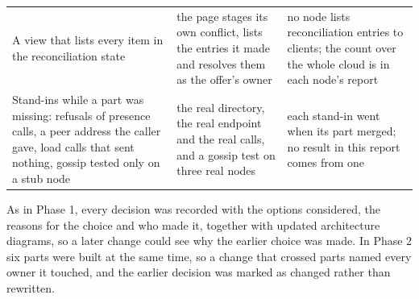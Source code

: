 \begin{table}[!htb]
\begin{tabularx}{\linewidth}{@{}P{3.9cm}P{4.1cm}L@{}}
A view that lists every item in the reconciliation state & the page stages its own conflict, lists the entries it made and resolves them as the offer's owner & no node lists reconciliation entries to clients; the count over the whole cloud is in each node's report \\ %
Stand-ins while a part was missing: refusals of presence calls, a peer address the caller gave, load calls that sent nothing, gossip tested only on a stub node & the real directory, the real endpoint and the real calls, and a gossip test on three real nodes & each stand-in went when its part merged; no result in this report comes from one \\ %
\bottomrule
\end{tabularx}
\end{table}

As in Phase 1, every decision was recorded with the options considered, the reasons for the choice and who made it, together with updated architecture diagrams, so a later change could see why the earlier choice was made. In Phase 2 six parts were built at the same time, so a change that crossed parts named every owner it touched, and the earlier decision was marked as changed rather than rewritten.
